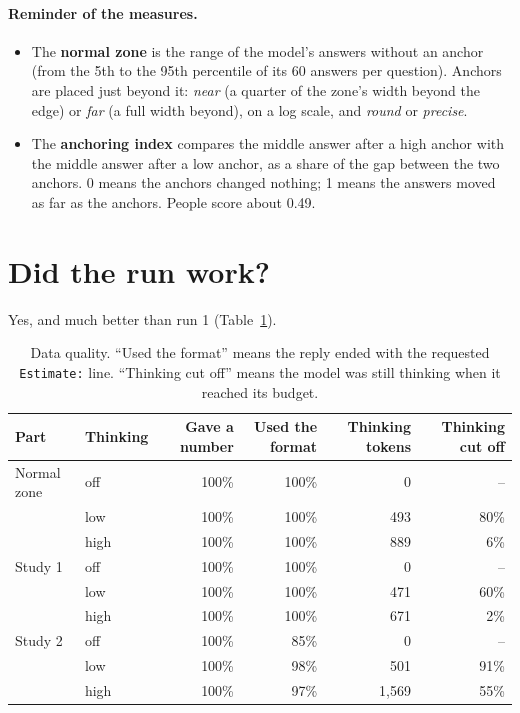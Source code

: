 \documentclass[11pt,a4paper]{article}
\begin{document}
\paragraph{Reminder of the measures.}
\begin{itemize}
  \item The \textbf{normal zone} is the range of the model's answers without an anchor (from the 5th to the 95th percentile of its 60 answers per question). Anchors are placed just beyond it: \emph{near} (a quarter of the zone's width beyond the edge) or \emph{far} (a full width beyond), on a log scale, and \emph{round} or \emph{precise}.
  \item The \textbf{anchoring index} \citep{jacowitz1995measures} compares the middle answer after a high anchor with the middle answer after a low anchor, as a share of the gap between the two anchors. 0 means the anchors changed nothing; 1 means the answers moved as far as the anchors. People score about 0.49.
\end{itemize}

\section{Did the run work?}

Yes, and much better than run 1 (Table~\ref{tab:quality}).

\begin{table}[ht]
\centering\small
\begin{tabular}{llrrrr}
\toprule
Part & Thinking & Gave a number & Used the format & Thinking tokens & Thinking cut off \\
\midrule
Normal zone & off  & 100\% & 100\% & 0     & -- \\
            & low  & 100\% & 100\% & 493   & 80\% \\
            & high & 100\% & 100\% & 889   & 6\% \\
Study 1     & off  & 100\% & 100\% & 0     & -- \\
            & low  & 100\% & 100\% & 471   & 60\% \\
            & high & 100\% & 100\% & 671   & 2\% \\
Study 2     & off  & 100\% & 85\%  & 0     & -- \\
            & low  & 100\% & 98\%  & 501   & 91\% \\
            & high & 100\% & 97\%  & 1,569 & 55\% \\
\bottomrule
\end{tabular}
\caption{Data quality. \enquote{Used the format} means the reply ended with the requested \texttt{Estimate:} line. \enquote{Thinking cut off} means the model was still thinking when it reached its budget.}
\label{tab:quality}
\end{table}
\end{document}
